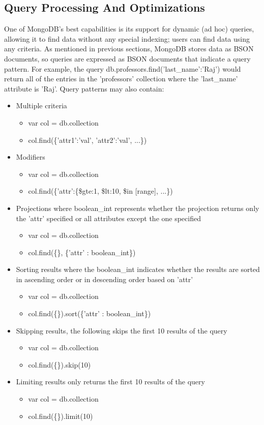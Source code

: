 \documentclass{dependencies/acm_proc_article-sp}
\begin{document}
\subsection{Query Processing And Optimizations}
One of MongoDB's best capabilities is its support for dynamic (ad hoc) queries, allowing it to find data without any special indexing; users can find data using any criteria.
As mentioned in previous sections, MongoDB stores data as BSON documents, so queries are expressed as BSON documents that indicate a query pattern.
For example, the query db.professors.find({'last\_name':'Raj'}) would return all of the entries in the 'professors' collection where the 'last\_name' attribute is 'Raj'.
Query patterns may also contain:
\begin{itemize}
\item Multiple criteria
 \begin{itemize}
  \item var col = db.collection
  \item col.find(\{'attr1':'val', 'attr2':'val', ...\})
 \end{itemize}
\item Modifiers
  \begin{itemize}
   \item var col = db.collection
   \item col.find(\{'attr':\{\$gte:1, \$lt:10, \$in [range], ...\})
  \end{itemize}
\item Projections where boolean\_int represents whether the projection returns only the 'attr' specified\cite{12} or all attributes except the one specified\cite{11}
  \begin{itemize}
    \item var col = db.collection
    \item col.find(\{\}, \{'attr' : boolean\_int\})
  \end{itemize}
\item Sorting results where the boolean\_int indicates whether the results are sorted in ascending order\cite{12} or in descending order\cite{11} based on 'attr'
  \begin{itemize}
    \item var col = db.collection
    \item col.find(\{\}).sort(\{'attr' : boolean\_int\})
  \end{itemize}
\item Skipping results, the following skips the first 10 results of the query
  \begin{itemize}
    \item var col = db.collection
    \item col.find(\{\}).skip(10)
  \end{itemize}
\item Limiting results only returns the first 10 results of the query
  \begin{itemize}
    \item var col = db.collection
    \item col.find(\{\}).limit(10)
  \end{itemize}
\end{itemize}
\end{document}
